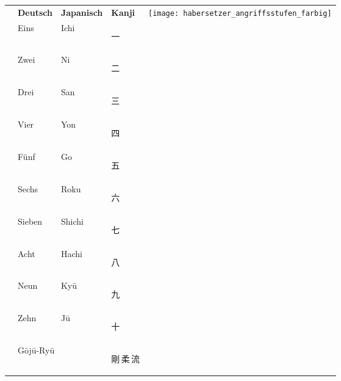 \setcounter{numz}{0}	
\begin{tcolorbox}[colframe=lightgray,colback=white,coltitle=black,title=Allgemeines:\indent Zahlen - Angriffsstufen - Begriffe]
	\null\vfill\null	
	\begin{tabularx}{\textwidth}{lllll}		
		& \textbf{Deutsch} 	& \textbf{Japanisch} 	& \textbf{Kanji} &\multirow{13}{*}{\texttt{[image: habersetzer\_angriffsstufen\_farbig]}} \\
		\ctuz 	& Eins 				& Ichi 					& \begin{CJK*}{UTF8}{ipxm}\color{Navy}一\end{CJK*} 	& \\
		\ctuz 	& Zwei 				& Ni 					& \begin{CJK*}{UTF8}{ipxm}\color{Navy}二\end{CJK*} 	& \\ 
		\ctuz 	& Drei 				& San 					& \begin{CJK*}{UTF8}{ipxm}\color{Navy}三\end{CJK*} 	& \\
		\ctuz 	& Vier 				& Yon 					& \begin{CJK*}{UTF8}{ipxm}\color{Navy}四\end{CJK*} 	& \\
		\ctuz 	& Fünf 				& Go 					& \begin{CJK*}{UTF8}{ipxm}\color{Navy}五\end{CJK*} 	& \\
		\ctuz 	& Sechs 			& Roku 					& \begin{CJK*}{UTF8}{ipxm}\color{Navy}六\end{CJK*} 	& \\
		\ctuz 	& Sieben 			& Shichi 				& \begin{CJK*}{UTF8}{ipxm}\color{Navy}七\end{CJK*} 	& \\
		\ctuz 	& Acht 				& Hachi 				& \begin{CJK*}{UTF8}{ipxm}\color{Navy}八\end{CJK*} 	& \\
		\ctuz 	& Neun 				& Kyū 					& \begin{CJK*}{UTF8}{ipxm}\color{Navy}九\end{CJK*} 	& \\
		\ctuz 	& Zehn 				& Jū 					& \begin{CJK*}{UTF8}{ipxm}\color{Navy}十\end{CJK*} 	& \\
		\addlinespace
		& \multicolumn{2}{l}{G\={o}j\={u}-Ry\={u}}	& {\LARGE \begin{CJK*}{UTF8}{ipxm}\color{GKD}剛\,柔\,流\end{CJK*}}        & \\ 	

\end{tabularx}
\end{tcolorbox}
